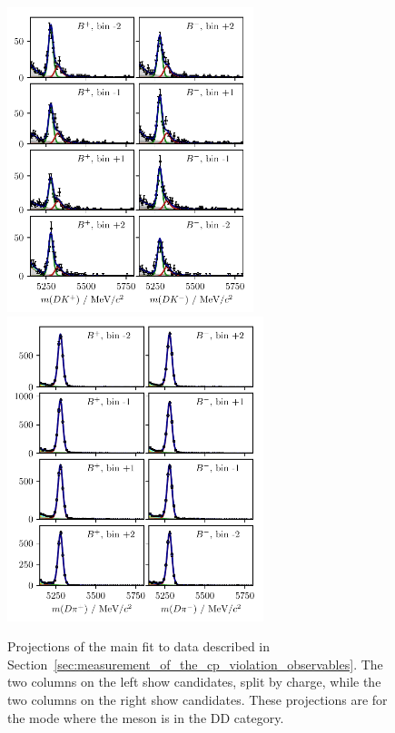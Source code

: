 \begin{figure}[tp]
    \centering
    \includegraphics[height=3.5in]{figures/analysis/bin_by_bin/pretty_fit_bins_dk_DD_1_d2kskk.pdf}
    \includegraphics[height=3.5in]{figures/analysis/bin_by_bin/pretty_fit_bins_dpi_DD_1_d2kskk.pdf}
    \caption{Projections of the main fit to data described in Section~\ref{sec:measurement_of_the_cp_violation_observables}. The two columns on the left show \BtoDK candidates, split by charge, while the two columns on the right show \BtoDpi candidates. These projections are for the \DtoKskk mode where the \KS meson is in the DD category.}
    \label{fig:all_proj_DD_kskk}
\end{figure}